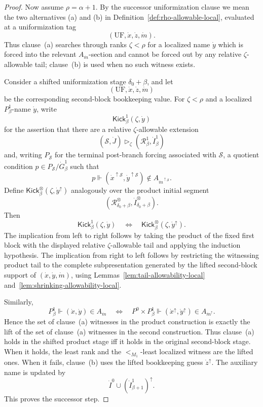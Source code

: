 \documentclass[a4paper,11pt]{article}
\begin{document}
\begin{proof}
Now assume \(\rho=\alpha+1\).  By the successor uniformization clause we mean
the two alternatives (a) and (b) in Definition~\ref{def:rho-allowable-local},
evaluated at a uniformization tag
\[
   (\mathrm{UF},\dot x,\dot z,\dot m).
\]
Thus clause~(a) searches through ranks \(\zeta<\rho\) for a localized name
\(\dot y\) which is forced into the relevant \(A_{\dot m}\)-section and cannot
be forced out by any relative \(\zeta\)-allowable tail; clause~(b) is used when
no such witness exists.

Consider a shifted uniformization stage \(\delta_0+\beta\), and let
\[
   (\mathrm{UF},\dot x,\dot z,\dot m)
\]
be the corresponding second-block bookkeeping value.  For \(\zeta<\rho\) and a
localized \(P^1_\beta\)-name \(\dot y\), write
\[
   \mathsf{Kick}^1_\beta(\zeta,\dot y)
\]
for the assertion that there are a relative \(\zeta\)-allowable extension
\[
   (\mathcal S,\dot J)\triangleright_\zeta
   (\mathcal R^1_\beta,\dot I^1_\beta)
\]
and, writing \(P_{\mathcal S}\) for the terminal post-branch forcing associated
with \(\mathcal S\), a quotient condition \(p\in P_{\mathcal S}/\dot G^1_\beta\)
such that
\[
   p\Vdash
   (\dot x^{\uparrow\mathcal S},
    \dot y^{\uparrow\mathcal S})
      \notin A_{\dot m^{\uparrow\mathcal S}}.
\]
Define \(\mathsf{Kick}^\otimes_\beta(\zeta,\dot y^\uparrow)\) analogously over
the product initial segment
\[
   (\mathcal R^\otimes_{\delta_0+\beta},
    \dot I^\otimes_{\delta_0+\beta}).
\]
Then
\[
   \mathsf{Kick}^1_\beta(\zeta,\dot y)
   \quad\Longleftrightarrow\quad
   \mathsf{Kick}^\otimes_\beta(\zeta,\dot y^\uparrow).
\]
The implication from left to right follows by taking the product of the fixed
first block with the displayed relative \(\zeta\)-allowable tail and applying
the induction hypothesis.  The implication from right to left follows by
restricting the witnessing product tail to the complete subpresentation
generated by the lifted second-block support of
\((\dot x,\dot y,\dot m)\), using Lemmas~\ref{lem:tail-allowability-local}
and~\ref{lem:shrinking-allowability-local}.

Similarly,
\[
   P^1_\beta\Vdash (\dot x,\dot y)\in A_{\dot m}
   \quad\Longleftrightarrow\quad
   P^0\times P^1_\beta
      \Vdash
      (\dot x^\uparrow,\dot y^\uparrow)\in A_{\dot m^\uparrow}.
\]
Hence the set of clause~(a) witnesses in the product construction is exactly
the lift of the set of clause~(a) witnesses in the second construction.  Thus
clause~(a) holds in the shifted product stage iff it holds in the original
second-block stage.  When it holds, the least rank and the \(<_{M_1}\)-least
localized witness are the lifted ones.  When it fails, clause~(b) uses the
lifted bookkeeping guess \(\dot z^\uparrow\).  The auxiliary name is updated by
\[
   \dot I^0\cup(\dot I^1_{\beta+1})^\uparrow.
\]
This proves the successor step.


\end{proof}
\end{document}
